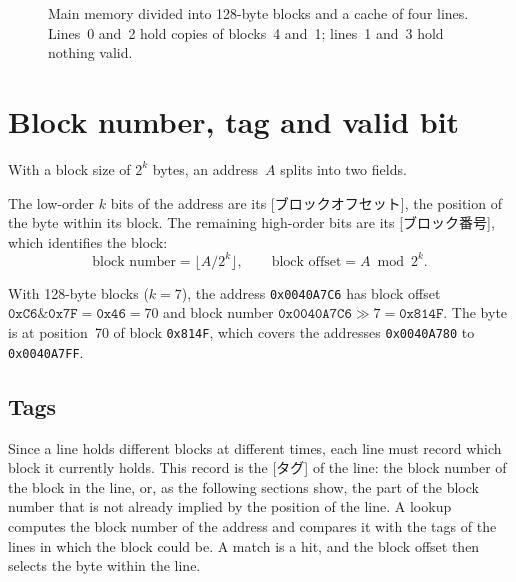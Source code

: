 \documentclass[../main.tex]{subfiles}
\begin{document}
\begin{figure}[htbp]
  \centering
  
  \caption{Main memory divided into 128-byte blocks and a cache of
    four lines.  Lines~0 and~2 hold copies of blocks~4 and~1; lines~1 and~3
    hold nothing valid.}
  \label{fig:l12-blocks}
\end{figure}

\section{Block number, tag and valid bit}
\label{sec:l12-tags}

With a block size of $2^{k}$ bytes, an address~$A$ splits into two
fields.

\begin{definition}
  The low-order $k$ bits of the address are its
  [ブロックオフセット], the position of the byte within
  its block.  The remaining high-order bits are its
  [ブロック番号], which identifies the block:
  \begin{equation}
    \text{block number} = \bigl\lfloor A / 2^{k} \bigr\rfloor ,
    \qquad
    \text{block offset} = A \bmod 2^{k} .
    \label{eq:l12-block-number}
  \end{equation}
\end{definition}

\begin{example}
  \label{ex:l12-block-number}
  With 128-byte blocks ($k=7$), the address \texttt{0x0040A7C6} has
  block offset $\texttt{0xC6} \mathbin{\&} \texttt{0x7F} = \texttt{0x46} = 70$
  and block number $\texttt{0x0040A7C6} \gg 7 = \texttt{0x814F}$.  The byte
  is at position~70 of block \texttt{0x814F}, which covers the addresses
  \texttt{0x0040A780} to \texttt{0x0040A7FF}.
\end{example}

\subsection{Tags}

Since a line holds different blocks at different times, each line must
record which block it currently holds.  This record is the
[タグ] of the line: the block number of the block in the line, or,
as the following sections show, the part of the block number that is not
already implied by the position of the line.  A lookup computes the block
number of the address and compares it with the tags of the lines in which
the block could be.  A match is a hit, and the block offset then selects the
byte within the line.
\end{document}
